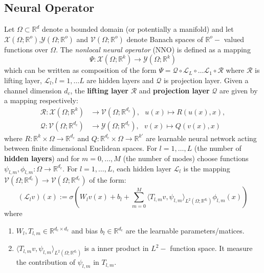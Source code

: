 \documentclass[reqno]{amsart}
\theoremstyle{plain}
\theoremstyle{definition}
\newcommand{\bb}[1]{\mathbb{#1}}
\newcommand{\cal}[1]{\mathcal{#1}}
\begin{document}
\subsection{\bf Neural Operator}
Let $\Omega \subset \bb R^d$ denote a bounded domain (or potentially a manifold) and let $\cal X(\Omega;\bb R^o)$,$\cal Y(\Omega;\bb R^o)$ and $\cal V(\Omega;\bb R^o)$ denote Banach spaces of $\bb R^o-$ valued functions over $\Omega$. The {\it nonlocal neural operator} (NNO) is defined as a mapping 
$$ \Psi \colon \cal X(\Omega;\bb R^k) \to \cal Y(\Omega;\bb R^k)$$ 
which can be written as composition of the form $\Psi = \cal Q \circ \cal L_L \circ \dots \cal L_1 \circ \cal R$ where $\cal R$ is lifting layer, $\cal L_l, l = 1, \dots L$ are hidden layers and $\cal Q$ is projection layer. Given a channel dimension $d_c$, the {\bf lifting layer} $\cal R$ and {\bf projection layer} $\cal Q$ are given by a mapping respectively:
\begin{align}
    \cal R \colon \cal X(\Omega;\bb R^k) & \to \cal V(\Omega;\bb R^{d_c}),~~~ u(x) \mapsto R(u(x),x), \\
    \cal Q : \cal V(\Omega;\bb R^{d_c}) & \to \cal Y(\Omega;\bb R^{d_c}),~~~v(x) \mapsto Q(v(x),x)
\end{align}
where $R \colon \bb R^k \times \Omega \to \bb R^{d_c}$ and $Q : \bb R^{d_c} \times \Omega \to \bb R^{k'}$ are learnable neural network acting between finite dimensional Euclidean spaces. For $l = 1, \dots, L$ (the number of  {\bf hidden layers}) and for $m = 0, \dots, M$ (the number of modes) choose functions $\psi_{l,m},\phi_{l,m} \colon \Omega \to \bb R^{d_c}$. For $l = 1,\dots, L$, each hidden layer $\cal L_l$ is the mapping $\cal V(\Omega;\bb R^{d_c}) \to \cal V(\Omega;\bb R^{d_c})$ of the form:
$$ (\cal L_lv)(x) := \sigma\left(W_lv(x) + b_l + \sum_{m=0}^M \langle T_{l,m}v,\psi_{l,m}\rangle_{L^2(\Omega;\bb R^{d_c})}\phi_{l,m}(x)\right) $$
where
\begin{enumerate}
    \item $W_l,T_{l,m}\in \bb R^{d_c \times d_c}$ and bias $b_l \in \bb R^{d_c}$ are the learnable parameters/matices.
    \item $\langle T_{l,m}v,\psi_{l,m}\rangle_{L^2(\Omega;\bb R^{d_c})}$ is a inner product in $L^2-$ function space. It measure the contribution of $\psi_{l,m}$ in $T_{l,m}$.
\end{enumerate}
\end{document}
